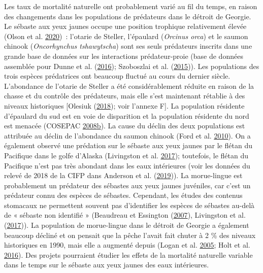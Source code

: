 \documentclass[french,11pt]{book}
\begin{document}
Les taux de mortalité naturelle ont probablement varié au fil du temps, en raison des changements dans les populations de prédateurs dans le détroit de Georgie. Le sébaste aux yeux jaunes occupe une position trophique relativement élevée (Olson et al. \protect\hyperlink{ref-olson2020}{2020})~: l'otarie de Steller, l'épaulard (\emph{Orcinus orca}) et le saumon chinook (\emph{Oncorhynchus tshawytscha}) sont ses seuls prédateurs inscrits dans une grande base de données sur les interactions prédateur-proie (base de données assemblée pour Dunne et al. (\protect\hyperlink{ref-dunne2016}{2016}); Szoboszlai et al. (\protect\hyperlink{ref-szoboszlai2015}{2015})). Les populations des trois espèces prédatrices ont beaucoup fluctué au cours du dernier siècle. L'abondance de l'otarie de Steller a été considérablement réduite en raison de la chasse et du contrôle des prédateurs, mais elle s'est maintenant rétablie à des niveaux historiques {[}Olesiuk (\protect\hyperlink{ref-olesiuk2018}{2018}); voir l'annexe F{]}. La population résidente d'épaulard du sud est en voie de disparition et la population résidente du nord est menacée (COSEPAC \protect\hyperlink{ref-cosewic2008b}{2008}\protect\hyperlink{ref-cosewic2008b}{b}). La cause du déclin des deux populations est attribuée au déclin de l'abondance du saumon chinook (Ford et al. \protect\hyperlink{ref-ford2010}{2010}). On a également observé une prédation sur le sébaste aux yeux jaunes par le flétan du Pacifique dans le golfe d'Alaska (Livingston et al. \protect\hyperlink{ref-livingston2017}{2017}); toutefois, le flétan du Pacifique n'est pas très abondant dans les eaux intérieures (voir les données du relevé de 2018 de la CIFP dans Anderson et al. (\protect\hyperlink{ref-anderson2019synopsis}{2019})). La morue-lingue est probablement un prédateur des sébastes aux yeux jaunes juvéniles, car c'est un prédateur connu des espèces de sébastes. Cependant, les études des contenus stomacaux ne permettent souvent pas d'identifier les espèces de sébastes au-delà de « sébaste non identifié » (Beaudreau et Essington (\protect\hyperlink{ref-beaudreau2007}{2007}), Livingston et al. (\protect\hyperlink{ref-livingston2017}{2017})). La population de morue-lingue dans le détroit de Georgie a également beaucoup décliné et on pensait que la pêche l'avait fait chuter à 2 \% des niveaux historiques en 1990, mais elle a augmenté depuis (Logan et al. \protect\hyperlink{ref-logan2005}{2005}; Holt et al. \protect\hyperlink{ref-holt2016}{2016}). Des projets pourraient étudier les effets de la mortalité naturelle variable dans le temps sur le sébaste aux yeux jaunes des eaux intérieures.
\end{document}
